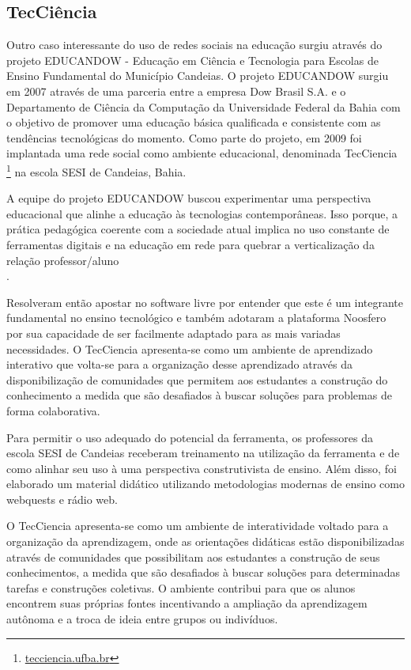 \subsection{TecCiência}

Outro caso interessante do uso de redes sociais na educação surgiu através do
projeto EDUCANDOW \cite{santos2012} - Educação em Ciência e Tecnologia para
Escolas de Ensino Fundamental do Município Candeias. O projeto EDUCANDOW surgiu
em 2007 através de uma parceria entre a empresa Dow Brasil S.A. e o Departamento
de Ciência da Computação da Universidade Federal da Bahia com o objetivo de
promover uma educação básica qualificada e consistente com as tendências tecnológicas
do momento. Como parte do projeto, em 2009 foi implantada uma rede social como
ambiente educacional, denominada TecCiencia \footnote{\url{tecciencia.ufba.br}}
na escola SESI de Candeias, Bahia.

A equipe do projeto EDUCANDOW buscou experimentar uma perspectiva educacional que
alinhe a educação às tecnologias contemporâneas.
%
Isso porque, a prática pedagógica coerente com a sociedade atual implica no uso
constante de ferramentas digitais e na educação em rede para quebrar a verticalização
da relação professor/aluno \\ \cite{santos2012}.

Resolveram então apostar no software livre por entender que este é um integrante
fundamental no ensino tecnológico e também adotaram a plataforma Noosfero por sua
capacidade de ser facilmente adaptado para as mais variadas necessidades. O
TecCiencia apresenta-se como um ambiente de aprendizado interativo que volta-se
para a organização desse aprendizado através da disponibilização de comunidades
que permitem aos estudantes a construção do conhecimento a medida que são
desafiados à buscar soluções para problemas de forma colaborativa.

Para permitir o uso adequado do potencial da ferramenta, os professores da escola
SESI de Candeias receberam treinamento na utilização da ferramenta e de como alinhar
seu uso à uma perspectiva construtivista de ensino. Além disso, foi elaborado um
material didático utilizando metodologias modernas de ensino como webquests e
rádio web.

O TecCiencia apresenta-se como um ambiente de interatividade voltado para a
organização da aprendizagem, onde as orientações didáticas estão disponibilizadas
através de comunidades que possibilitam aos estudantes a construção de seus
conhecimentos, a medida que são desafiados à buscar soluções para determinadas
tarefas e construções coletivas. O ambiente contribui para que os alunos encontrem
suas próprias fontes incentivando a ampliação da aprendizagem autônoma e a
troca de ideia entre grupos ou indivíduos.

